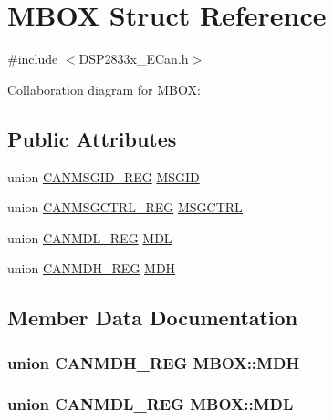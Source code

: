 \hypertarget{struct_m_b_o_x}{}\section{M\+B\+O\+X Struct Reference}
\label{struct_m_b_o_x}


{\ttfamily \#include $<$D\+S\+P2833x\+\_\+\+E\+Can.\+h$>$}



Collaboration diagram for M\+B\+O\+X\+:
\subsection*{Public Attributes}
\begin{DoxyCompactItemize}
\item 
union \hyperlink{union_c_a_n_m_s_g_i_d___r_e_g}{C\+A\+N\+M\+S\+G\+I\+D\+\_\+\+R\+E\+G} \hyperlink{struct_m_b_o_x_a602299e8b2d4bac089e4d164138f0c24}{M\+S\+G\+I\+D}
\item 
union \hyperlink{union_c_a_n_m_s_g_c_t_r_l___r_e_g}{C\+A\+N\+M\+S\+G\+C\+T\+R\+L\+\_\+\+R\+E\+G} \hyperlink{struct_m_b_o_x_a9737a3ed69918d5077130d7c31142154}{M\+S\+G\+C\+T\+R\+L}
\item 
union \hyperlink{union_c_a_n_m_d_l___r_e_g}{C\+A\+N\+M\+D\+L\+\_\+\+R\+E\+G} \hyperlink{struct_m_b_o_x_ac03f9216b6498a59bb55b5b0e9059ff8}{M\+D\+L}
\item 
union \hyperlink{union_c_a_n_m_d_h___r_e_g}{C\+A\+N\+M\+D\+H\+\_\+\+R\+E\+G} \hyperlink{struct_m_b_o_x_a258d1dea544873892ef6abd13a4e9553}{M\+D\+H}
\end{DoxyCompactItemize}


\subsection{Member Data Documentation}
\hypertarget{struct_m_b_o_x_a258d1dea544873892ef6abd13a4e9553}{}
\subsubsection[{M\+D\+H}]{\setlength{\rightskip}{0pt plus 5cm}union {\bf C\+A\+N\+M\+D\+H\+\_\+\+R\+E\+G} M\+B\+O\+X\+::\+M\+D\+H}\label{struct_m_b_o_x_a258d1dea544873892ef6abd13a4e9553}
\hypertarget{struct_m_b_o_x_ac03f9216b6498a59bb55b5b0e9059ff8}{}
\subsubsection[{M\+D\+L}]{\setlength{\rightskip}{0pt plus 5cm}union {\bf C\+A\+N\+M\+D\+L\+\_\+\+R\+E\+G} M\+B\+O\+X\+::\+M\+D\+L}\label{struct_m_b_o_x_ac03f9216b6498a59bb55b5b0e9059ff8}
\hypertarget{struct_m_b_o_x_a9737a3ed69918d5077130d7c31142154}{}
